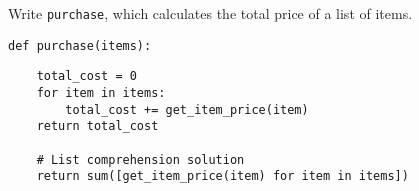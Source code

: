 \question
Write {\tt purchase}, which calculates
the total price of a list of items.

\begin{lstlisting}
def purchase(items):
\end{lstlisting}
\begin{solution}[1.5in]
\begin{lstlisting}
    total_cost = 0
    for item in items:
        total_cost += get_item_price(item)
    return total_cost

    # List comprehension solution
    return sum([get_item_price(item) for item in items])
\end{lstlisting}
\end{solution}

